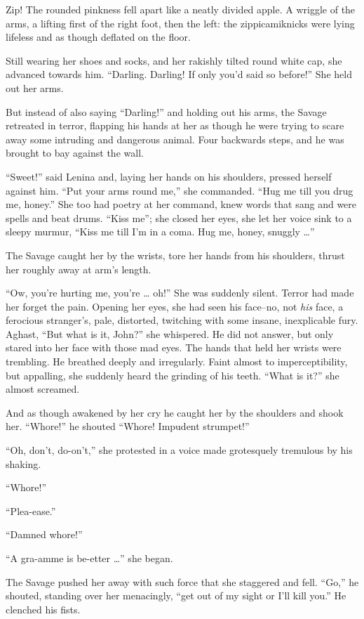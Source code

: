 \documentclass[12pt]{report}
\begin{document}
Zip! The rounded pinkness fell apart like a neatly divided apple. A
wriggle of the arms, a lifting first of the right foot, then the left:
the zippicamiknicks were lying lifeless and as though deflated on the
floor.

Still wearing her shoes and socks, and her rakishly tilted round white
cap, she advanced towards him. ``Darling. Darling! If only you'd said so
before!'' She held out her arms.

But instead of also saying ``Darling!'' and holding out his arms, the
Savage retreated in terror, flapping his hands at her as though he were
trying to scare away some intruding and dangerous animal. Four backwards
steps, and he was brought to bay against the wall.

``Sweet!'' said Lenina and, laying her hands on his shoulders, pressed
herself against him. ``Put your arms round me,'' she commanded. ``Hug me
till you drug me, honey.'' She too had poetry at her command, knew words
that sang and were spells and beat drums. ``Kiss me''; she closed her
eyes, she let her voice sink to a sleepy murmur, ``Kiss me till I'm in a
coma. Hug me, honey, snuggly \ldots{}''

The Savage caught her by the wrists, tore her hands from his shoulders,
thrust her roughly away at arm's length.

``Ow, you're hurting me, you're \ldots{} oh!'' She was suddenly silent.
Terror had made her forget the pain. Opening her eyes, she had seen his
face--no, not \emph{his} face, a ferocious stranger's, pale, distorted,
twitching with some insane, inexplicable fury. Aghast, ``But what is it,
John?'' she whispered. He did not answer, but only stared into her face
with those mad eyes. The hands that held her wrists were trembling. He
breathed deeply and irregularly. Faint almost to imperceptibility, but
appalling, she suddenly heard the grinding of his teeth. ``What is it?''
she almost screamed.

And as though awakened by her cry he caught her by the shoulders and
shook her. ``Whore!'' he shouted ``Whore! Impudent strumpet!''

``Oh, don't, do-on't,'' she protested in a voice made grotesquely
tremulous by his shaking.

``Whore!''

``Plea-ease.''

``Damned whore!''

``A gra-amme is be-etter \ldots{}'' she began.

The Savage pushed her away with such force that she staggered and fell.
``Go,'' he shouted, standing over her menacingly, ``get out of my sight
or I'll kill you.'' He clenched his fists.
\end{document}
